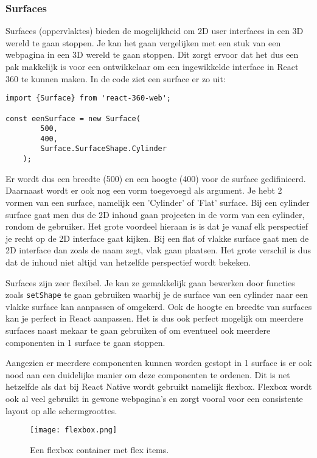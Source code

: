 \subsubsection{Surfaces}
\label{ssubsec:surfaces}
Surfaces (oppervlaktes) bieden de mogelijkheid om 2D user interfaces in een 3D wereld te gaan stoppen. Je kan het gaan vergelijken met een stuk van een webpagina in een 3D wereld te gaan stoppen. Dit zorgt ervoor dat het dus een pak makkelijk is voor een ontwikkelaar om een ingewikkelde interface in React 360 te kunnen maken. In de code ziet een surface er zo uit:

\begin{lstlisting}[frame=single, caption=Voorbeeld van een surface]
import {Surface} from 'react-360-web';

const eenSurface = new Surface(
		500,
		400,
		Surface.SurfaceShape.Cylinder
	);
\end{lstlisting}

Er wordt dus een breedte (500) en een hoogte (400) voor de surface gedifinieerd. Daarnaast wordt er ook nog een vorm toegevoegd als argument. Je hebt 2 vormen van een surface, namelijk een 'Cylinder' of 'Flat' surface. Bij een cylinder surface gaat men dus de 2D inhoud gaan projecten in de vorm van een cylinder, rondom de gebruiker. Het grote voordeel hieraan is is dat je vanaf elk perspectief je recht op de 2D interface gaat kijken. Bij een flat of vlakke surface gaat men de 2D interface dan zoals de naam zegt, vlak gaan plaatsen. Het grote verschil is dus dat de inhoud niet altijd van hetzelfde perspectief wordt bekeken.

Surfaces zijn zeer flexibel. Je kan ze gemakkelijk gaan bewerken door functies zoals \lstinline[basicstyle=\ttfamily\color{red}]|setShape| te gaan gebruiken waarbij je de surface van een cylinder naar een vlakke surface kan aanpassen of omgekerd. Ook de hoogte en breedte van surfaces kan je perfect in React aanpassen. Het is dus ook perfect mogelijk om meerdere surfaces naast mekaar te gaan gebruiken of om eventueel ook meerdere componenten in 1 surface te gaan stoppen. 

Aangezien er meerdere componenten kunnen worden gestopt in 1 surface is er ook nood aan een duidelijke manier om deze componenten te ordenen. Dit is net hetzelfde als dat bij React Native wordt gebruikt namelijk flexbox. Flexbox wordt ook al veel gebruikt in gewone webpagina's en zorgt vooral voor een consistente layout op alle schermgroottes.

\begin{figure}[H]
	\centering
	\texttt{[image: flexbox.png]}
	\caption{Een flexbox container met flex items.}
	\label{fig:flexbox}
\end{figure}

